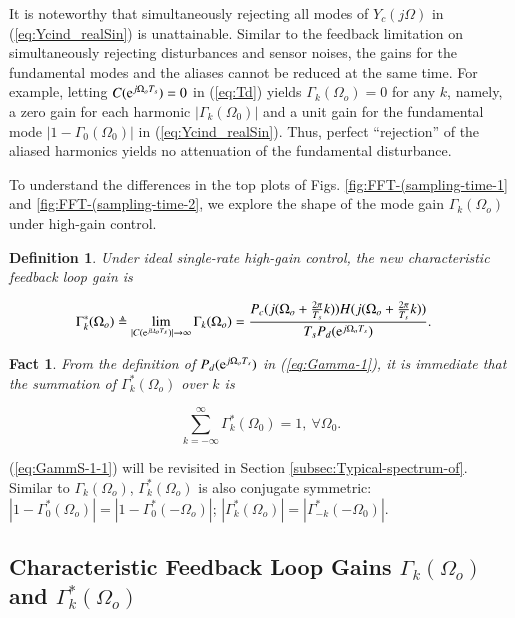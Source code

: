 \documentclass [11pt, proquest] {uwthesis}[2020/02/24]
\newtheorem{definition}{Definition}
\newtheorem{fact}{Fact}
\begin{document}
It is noteworthy that simultaneously rejecting all modes of $Y_{c}(j\Omega)$
in (\ref{eq:Ycind_realSin}) is unattainable. Similar to the feedback
limitation on simultaneously rejecting disturbances and sensor noises,
the gains for the fundamental modes and the aliases cannot be reduced
at the same time. For example, letting $C(\mathrm{e}^{j\Omega_{o}T_{s}})=0$
in (\ref{eq:Td}) yields $\Gamma_{k}(\Omega_{o})=0$ for any $k$,
namely, a zero gain for each harmonic $\left|\Gamma_{k}(\Omega_{0})\right|$
and a unit gain for the fundamental mode $\left|1-\Gamma_{0}(\Omega_{0})\right|$
in (\ref{eq:Ycind_realSin}). Thus, perfect ``rejection'' of the
aliased harmonics yields no attenuation of the fundamental disturbance.

To understand the differences in the top plots of Figs. \ref{fig:FFT-(sampling-time-1}
and \ref{fig:FFT-(sampling-time-2}, we explore the shape of the mode
gain $\Gamma_{k}(\Omega_{o})$ under high-gain control.

\begin{definition}Under ideal single-rate high-gain control, the
new characteristic feedback loop gain is

\begin{align}
\Gamma_{k}^{*}(\Omega_{o}) & \triangleq\lim_{|C(\mathrm{e}^{j\Omega_{o}T_{s}})|\to\infty}\Gamma_{k}(\Omega_{o})=\frac{P_{c}(j(\Omega_{o}+\frac{2\pi}{T_{s}}k))H(j(\Omega_{o}+\frac{2\pi}{T_{s}}k))}{T_{s}P_{d}(\mathrm{e}^{j\Omega_{o}T_{s}})}.\label{eq:GammaStar-1}
\end{align}
\end{definition}

\noindent \begin{fact}From the definition of $P_{d}(\mathrm{e}^{j\Omega_{o}T_{s}})$
in (\ref{eq:Gamma-1}), it is immediate that the summation of $\Gamma_{k}^{*}(\Omega_{o})$
over $k$ is

\begin{equation}
\sum_{k=-\infty}^{\infty}\Gamma_{k}^{*}(\Omega_{0})=1,\ \forall\Omega_{0}.\label{eq:GammS-1-1}
\end{equation}
\end{fact}

(\ref{eq:GammS-1-1}) will be revisited in Section \ref{subsec:Typical-spectrum-of}.
Similar to $\Gamma_{k}(\Omega_{o})$, $\Gamma_{k}^{*}(\Omega_{o})$
is also conjugate symmetric: $\left|1-\Gamma_{0}^{*}(\Omega_{o})\right|=\left|1-\Gamma_{0}^{*}(-\Omega_{o})\right|$;
$\left|\Gamma_{k}^{*}(\Omega_{o})\right|=\left|\Gamma_{-k}^{*}(-\Omega_{0})\right|$.

\subsection{\label{subsec:Characteristic-feedback-loop}Characteristic Feedback
Loop Gains $\Gamma_{k}(\Omega_{o})$ and $\Gamma_{k}^{*}(\Omega_{o})$}
\end{document}
